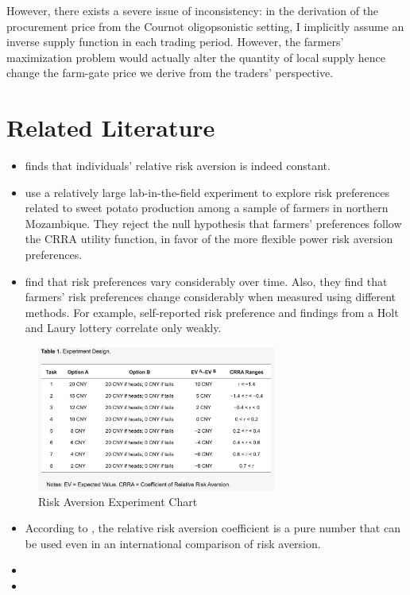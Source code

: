 \documentclass[12pt]{article}
\begin{document}
However, there exists a severe issue of inconsistency: in the derivation of the procurement price from the Cournot oligopsonistic setting, I implicitly assume an inverse supply function in each trading period. However, the farmers' maximization problem would actually alter the quantity of local supply hence change the farm-gate price we derive from the traders' perspective. 




\section{Related Literature}
\begin{itemize}
    \item \cite{chiappori2011relative} finds that individuals’ relative risk aversion is indeed constant. 
    
    \item \cite{de2014measuring} use a relatively large lab-in-the-field experiment to explore risk preferences related to sweet potato production among a sample of farmers in northern Mozambique. They reject the null hypothesis that farmers' preferences follow the CRRA utility function, in favor of the more flexible power risk aversion preferences. 

    \item \cite{finger2023stability} find that risk preferences vary considerably over time. Also, they find that farmers' risk preferences change considerably when measured using different methods. For example, self-reported risk preference and findings from a Holt and Laury lottery correlate only weakly. 
    
\end{itemize}

\begin{figure}[ht]
    \centering
    \includegraphics[width=0.7\textwidth]{Figures/RA_experiment_chart.png}
    \caption{Risk Aversion Experiment Chart}
    \label{fig:Risk Aversion Experiment Chart}
\end{figure}


\begin{itemize}
    \item According to \cite{hardaker2000some}, the relative risk aversion coefficient is a pure number that can be used even in an international comparison of risk aversion.
    
    \item 
    \item 
\end{itemize}

\newpage

\end{document}
